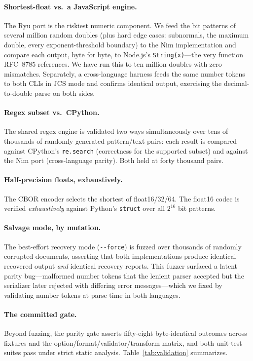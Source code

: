 \documentclass[11pt]{article}
\newcommand{\code}[1]{\texttt{#1}}
\begin{document}
\paragraph{Shortest-float vs.\ a JavaScript engine.}
The Ryu port is the riskiest numeric component. We feed the bit patterns of
several million random doubles (plus hard edge cases: subnormals, the maximum
double, every exponent-threshold boundary) to the Nim implementation and compare
each output, byte for byte, to Node.js's \code{String(x)}---the very function
RFC~8785 references. We have run this to ten million doubles with zero
mismatches. Separately, a cross-language harness feeds the same number tokens to
both CLIs in JCS mode and confirms identical output, exercising the
decimal-to-double parse on both sides.

\paragraph{Regex subset vs.\ CPython.}
The shared regex engine is validated two ways simultaneously over tens of
thousands of randomly generated pattern/text pairs: each result is compared
against CPython's \code{re.search} (correctness for the supported subset) and
against the Nim port (cross-language parity). Both held at forty thousand pairs.

\paragraph{Half-precision floats, exhaustively.}
The CBOR encoder selects the shortest of float16/32/64. The float16 codec is
verified \emph{exhaustively} against Python's \code{struct} over all $2^{16}$
bit patterns.

\paragraph{Salvage mode, by mutation.}
The best-effort recovery mode (\code{-{}-force}) is fuzzed over thousands of
randomly corrupted documents, asserting that both implementations produce
identical recovered output \emph{and} identical recovery reports. This fuzzer
surfaced a latent parity bug---malformed number tokens that the lenient parser
accepted but the serializer later rejected with differing error messages---which
we fixed by validating number tokens at parse time in both languages.

\paragraph{The committed gate.}
Beyond fuzzing, the parity gate asserts fifty-eight byte-identical outcomes across
fixtures and the option/format/validator/transform matrix, and both unit-test
suites pass under strict static analysis. Table~\ref{tab:validation} summarizes.
\end{document}
